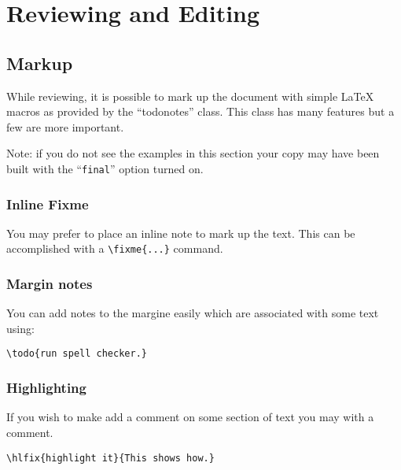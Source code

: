 \chapter{Reviewing and Editing}


\section{Markup}

While reviewing, it is possible to mark up the document with simple
\LaTeX{} macros as provided by the ``todonotes'' class.
This class has many features but a few are more important.

Note: if you do not see the examples in this section your copy may
have been built with the ``\texttt{final}'' option turned on.


\subsection{Inline Fixme}

You may prefer to place an inline note to mark up the text.
This can be accomplished with a  \verb|\fixme{...}| command.

\subsection{Margin notes}

You can add notes to the margine easily which
are associated with some text using:

\begin{verbatim}
\todo{run spell checker.}
\end{verbatim}

\subsection{Highlighting}

If you wish to make add a comment on some section of text you may
with a comment.


\begin{verbatim}
\hlfix{highlight it}{This shows how.}
\end{verbatim}


